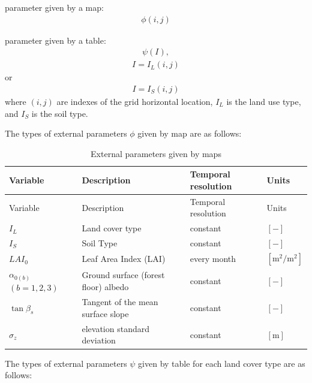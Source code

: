 parameter given by a map: \begin{eqnarray}
 \phi(i,j)
\end{eqnarray}

parameter given by a table: \begin{eqnarray}
 \psi(I),
\end{eqnarray} \begin{eqnarray}
 I = I_L (i,j)
\end{eqnarray} or \begin{eqnarray}
 I = I_S (i,j)
\end{eqnarray} where \((i,j)\) are indexes of the grid horizontal location, \(I_L\) is the land use type, and \(I_S\) is the soil type.

The types of external parameters \(\phi\) given by map are as follows:

\begin{longtable}[]{@{}llll@{}}
\caption{External parameters given by maps}\tabularnewline
\toprule\noalign{}
Variable & Description & Temporal resolution & Units \\
\midrule\noalign{}
\endfirsthead
\toprule\noalign{}
Variable & Description & Temporal resolution & Units \\
\midrule\noalign{}
\endhead
\bottomrule\noalign{}
\endlastfoot
\(I_L\) & Land cover type & constant & \(\mathrm{[-]}\) \\
\(I_S\) & Soil Type & constant & \(\mathrm{[-]}\) \\
\(LAI_0\) & Leaf Area Index (LAI) & every month & \(\mathrm{[m^2/m^2]}\) \\
\(\alpha_{0(b)}\) \((b=1,2,3)\) & Ground surface (forest floor) albedo & constant & \(\mathrm{[-]}\) \\
\(\tan\beta_{s}\) & Tangent of the mean surface slope & constant & \(\mathrm{[-]}\) \\
\(\sigma_z\) & elevation standard deviation & constant & \(\mathrm{[m]}\) \\
\end{longtable}

The types of external parameters \(\psi\) given by table for each land cover type are as follows:

